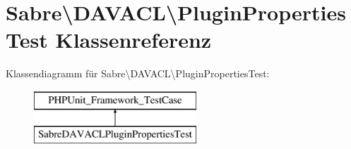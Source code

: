 \hypertarget{class_sabre_1_1_d_a_v_a_c_l_1_1_plugin_properties_test}{}\section{Sabre\textbackslash{}D\+A\+V\+A\+CL\textbackslash{}Plugin\+Properties\+Test Klassenreferenz}
\label{class_sabre_1_1_d_a_v_a_c_l_1_1_plugin_properties_test}
Klassendiagramm für Sabre\textbackslash{}D\+A\+V\+A\+CL\textbackslash{}Plugin\+Properties\+Test\+:\begin{figure}[H]
\begin{center}
\leavevmode
\includegraphics[height=2.000000cm]{class_sabre_1_1_d_a_v_a_c_l_1_1_plugin_properties_test}
\end{center}
\end{figure}
